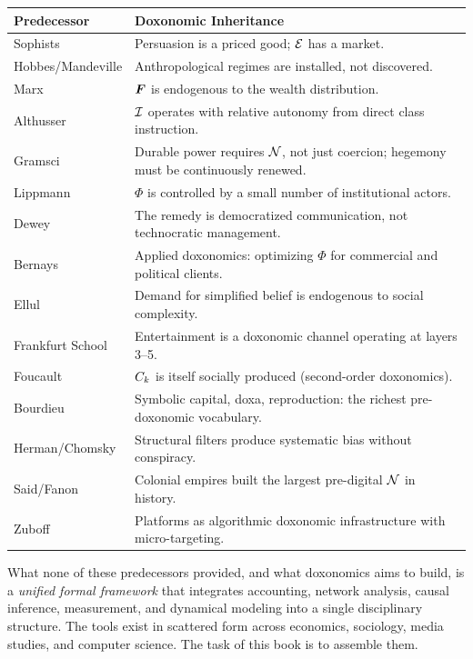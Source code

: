 \begin{center}
\begin{tabular}{lp{8cm}}
\toprule
\textbf{Predecessor} & \textbf{Doxonomic Inheritance} \\
\midrule
Sophists & Persuasion is a priced good; $\mathcal{E}$ has a market. \\
Hobbes/Mandeville & Anthropological regimes are installed, not discovered. \\
Marx & $\bm{F}$ is endogenous to the wealth distribution. \\
Althusser & $\mathcal{I}$ operates with relative autonomy from direct class instruction. \\
Gramsci & Durable power requires $\mathcal{N}$, not just coercion; hegemony must be continuously renewed. \\
Lippmann & $\Phi$ is controlled by a small number of institutional actors. \\
Dewey & The remedy is democratized communication, not technocratic management. \\
Bernays & Applied doxonomics: optimizing $\Phi$ for commercial and political clients. \\
Ellul & Demand for simplified belief is endogenous to social complexity. \\
Frankfurt School & Entertainment is a doxonomic channel operating at layers 3--5. \\
Foucault & $C_{k}$ is itself socially produced (second-order doxonomics). \\
Bourdieu & Symbolic capital, doxa, reproduction: the richest pre-doxonomic vocabulary. \\
Herman/Chomsky & Structural filters produce systematic bias without conspiracy. \\
Said/Fanon & Colonial empires built the largest pre-digital $\mathcal{N}$ in history. \\
Zuboff & Platforms as algorithmic doxonomic infrastructure with micro-targeting. \\
\bottomrule
\end{tabular}
\end{center}

What none of these predecessors provided, and what doxonomics aims to build, is a \emph{unified formal framework} that integrates accounting, network analysis, causal inference, measurement, and dynamical modeling into a single disciplinary structure.
The tools exist in scattered form across economics, sociology, media studies, and computer science.
The task of this book is to assemble them.


